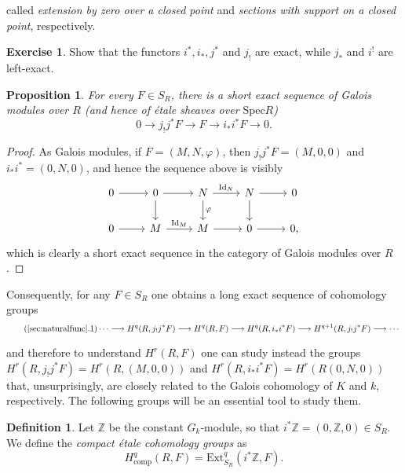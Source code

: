 \documentclass{article}
\newcommand{\Ext}{\mathrm{Ext}}
\newcommand{\comp}{\mathrm{comp}}
\newcommand{\Spec}{\mathrm{Spec}}
\newcommand{\Id}{\mathrm{Id}}
\newcommand{\ZZ}{\mathbb{Z}}
\theoremstyle{plain}
\newtheorem{proposition}[theorem]{Proposition}
\theoremstyle{definition}
\newtheorem{definition}[theorem]{Definition}
\newtheorem*{exercise}{Exercise}
\begin{document}
    called \textit{extension by zero over a closed point} and \textit{sections with support on a closed point}, respectively.

    \begin{exercise}
        Show that the functors $i^*, i_*, j^*$ and $j_!$ are exact, while $j_*$ and $i^!$ are left-exact.
    \end{exercise}
    \begin{proposition}\label{prop:sesmodules}
        For every $F\in S_R$, there is a short exact sequence of Galois modules over $R$ (and hence of \'{e}tale sheaves over $\Spec R$)
        $$0\longrightarrow j_!j^*F\longrightarrow F\longrightarrow i_*i^*F\longrightarrow 0.$$
    \end{proposition}
    \begin{proof}
        As Galois modules, if $F=(M,N,\varphi)$, then $j_!j^*F=(M,0,0)$ and $i_*i^*=(0,N,0)$, and hence the sequence above is visibly
        \[
            \begin{tikzcd}
                0 \arrow[r,""] & 0 \arrow[r,""] \arrow[d,""] & N \arrow[r,"\Id_N"] \arrow[d,"\varphi"] & N \arrow[r,""] \arrow[d,""] & 0 \\
                0 \arrow[r,""] & M \arrow[r,"\Id_M"] & M \arrow[r,""] & 0 \arrow[r,""] & 0,
            \end{tikzcd}
        \]
        which is clearly a short exact sequence in the category of Galois modules over $R$.
    \end{proof}

    Consequently, for any $F\in S_R$ one obtains a long exact sequence of cohomology groups
    \begin{equation}\label{eqn:longexact}\tag{\ref{sec:naturalfunc}.1}
        \cdots\longrightarrow H^q(R,j_!j^*F)\longrightarrow H^q(R,F)\longrightarrow H^q(R,i_*i^*F)\longrightarrow H^{q+1}(R,j_!j^*F)\longrightarrow\cdots   
    \end{equation}

    and therefore to understand $H^r(R,F)$ one can study instead the groups $H^r(R,j_!j^*F)=H^r(R,(M,0,0))$ and $H^r(R,i_*i^*F)=H^r(R(0,N,0))$ that, unsurprisingly, are closely related to the Galois cohomology of $K$ and $k$, respectively. The following groups will be an essential tool to study them.

    \begin{definition}
        Let $\ZZ$ be the constant $G_k$-module, so that $i^*\ZZ=(0,\ZZ,0)\in S_R$. We define the \textit{compact \'{e}tale cohomology groups} as
        $$H^q_{\comp}(R,F)=\Ext^q_{S_R}(i^*\ZZ,F).$$
    \end{definition}
\end{document}

